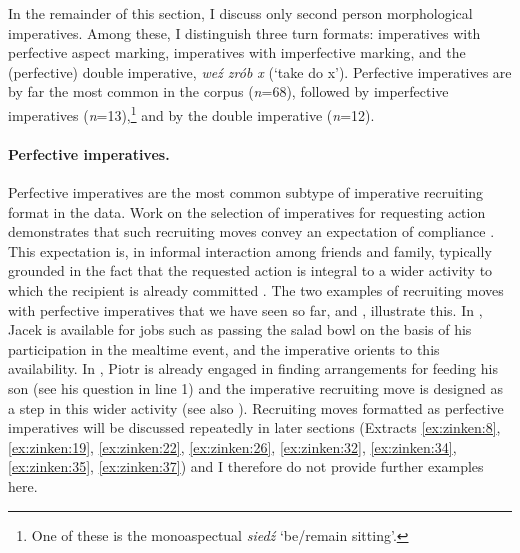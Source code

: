 \documentclass[output=paper]{langsci/langscibook}
\begin{document}
In the remainder of this section, I discuss only second person morphological imperatives.  Among these, I distinguish three turn formats: imperatives with perfective aspect marking, imperatives with imperfective marking, and the (perfective) double imperative, \textit{weź zrób x} (`take do x').  Perfective imperatives are by far the most common in the corpus (\textit{n}=68), followed by imperfective imperatives (\textit{n}=13),\footnote{One of these is the monoaspectual \textit{siedź} ‘be/remain sitting’.} and by the double imperative (\textit{n}=12).

\paragraph{Perfective imperatives.}\label{sec:zinken:3.3.1.1.} Perfective imperatives are the most common subtype of imperative recruiting format in the data.  Work on the selection of imperatives for requesting action demonstrates that such recruiting moves convey an expectation of compliance \citep{Wootton1997,Goodwin2006,CravenPotter2010,Kent2011,kent_compliance_2012,Rossi2012}. This expectation is, in informal interaction among friends and family, typically grounded in the fact that the requested action is integral to a wider activity to which the recipient is already committed \citep{Wootton1997,Rossi2012}.  The two examples of recruiting moves with perfective imperatives that we have seen so far,  and , illustrate this. In , Jacek is available for jobs such as passing the salad bowl on the basis of his participation in the mealtime event, and the imperative orients to this availability.  In , Piotr is already engaged in finding arrangements for feeding his son (see his question in line 1) and the imperative recruiting move is designed as a step in this wider activity (see also \citealt{ZinkenDeppermann2017}).  Recruiting moves formatted as perfective imperatives will be discussed repeatedly in later sections (Extracts \ref{ex:zinken:8}, \ref{ex:zinken:19}, \ref{ex:zinken:22}, \ref{ex:zinken:26}, \ref{ex:zinken:32}, \ref{ex:zinken:34}, \ref{ex:zinken:35}, \ref{ex:zinken:37}) and I therefore do not provide further examples here.
\end{document}

